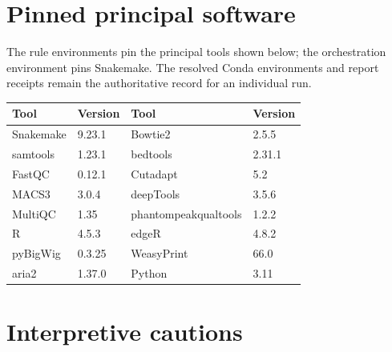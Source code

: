 \documentclass[11pt]{article}
\begin{document}
\section{Pinned principal software}

The rule environments pin the principal tools shown below; the orchestration
environment pins Snakemake.  The resolved Conda environments and report
receipts remain the authoritative record for an individual run.

\begin{center}
\begin{tabular}{ll@{\qquad}ll}
\toprule
Tool & Version & Tool & Version \\
\midrule
Snakemake & 9.23.1 & Bowtie2 & 2.5.5 \\
samtools & 1.23.1 & bedtools & 2.31.1 \\
FastQC & 0.12.1 & Cutadapt & 5.2 \\
MACS3 & 3.0.4 & deepTools & 3.5.6 \\
MultiQC & 1.35 & phantompeakqualtools & 1.2.2 \\
R & 4.5.3 & edgeR & 4.8.2 \\
pyBigWig & 0.3.25 & WeasyPrint & 66.0 \\
aria2 & 1.37.0 & Python & 3.11 \\
\bottomrule
\end{tabular}
\end{center}

\section{Interpretive cautions}
\end{document}
